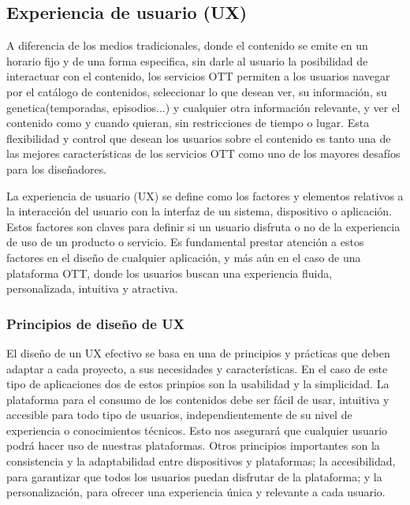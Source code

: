 \subsection{Experiencia de usuario (UX)}
\label{sec:fundamentos_teoricos_ux}

A diferencia de los medios tradicionales, donde el contenido se emite en un horario fijo y de una forma
especifica, sin darle al usuario la posibilidad de interactuar con el contenido, los servicios OTT permiten
a los usuarios navegar por el catálogo de contenidos, seleccionar lo que desean ver, su información, 
su genetica(temporadas, episodios...) y cualquier otra información relevante, y ver el contenido como y cuando
quieran, sin restricciones de tiempo o lugar. Esta flexibilidad y control que desean los usuarios sobre el contenido
es tanto una de las mejores características de los servicios OTT como uno de los mayores desafíos para los diseñadores.

La experiencia de usuario (UX) \cite{UX} se define como los factores y elementos relativos a la interacción del usuario
con la interfaz de un sistema, dispositivo o aplicación. Estos factores son claves para definir si un usuario disfruta
o no de la experiencia de uso de un producto o servicio. Es fundamental prestar atención a estos factores en el diseño
de cualquier aplicación, y más aún en el caso de una plataforma OTT, donde los usuarios buscan una experiencia fluida,
personalizada, intuitiva y atractiva.

\subsubsection{Principios de diseño de UX}
\label{subsec:fundamentos_teoricos_ux_principios}

El diseño de un UX efectivo se basa en una de principios y prácticas que deben adaptar a cada proyecto, a sus necesidades
y características. En el caso de este tipo de aplicaciones dos de estos prinpios son la usabilidad y la simplicidad.
La plataforma para el consumo de los contenidos debe ser fácil de usar, intuitiva y accesible para todo tipo de usuarios,
independientemente de su nivel de experiencia o conocimientos técnicos. Esto nos asegurará que cualquier usuario podrá 
hacer uso de nuestras plataformas. Otros principios importantes son la consistencia y la adaptabilidad entre dispositivos
y plataformas; la accesibilidad, para garantizar que todos los usuarios puedan disfrutar de la plataforma; y la personalización,
para ofrecer una experiencia única y relevante a cada usuario.

